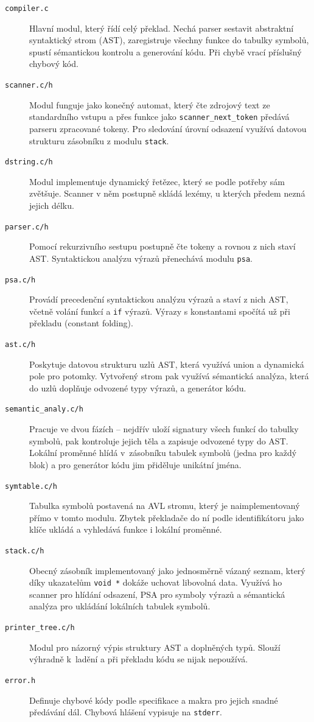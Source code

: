 \documentclass[a4paper,11pt]{article}
\begin{document}
\begin{description}
  \item[\texttt{compiler.c}] Hlavní modul, který řídí celý překlad.
  Nechá parser
  sestavit abstraktní
  syntaktický strom (AST), zaregistruje všechny funkce do tabulky symbolů, spustí
  sémantickou kontrolu a generování kódu. Při chybě vrací příslušný
  chybový kód.
  \item[\texttt{scanner.c/h}] Modul funguje jako konečný automat, který čte zdrojový text ze standardního vstupu a přes funkce jako \texttt{scanner\_next\_token} předává parseru zpracované tokeny. Pro sledování úrovní odsazení využívá datovou strukturu zásobníku z modulu \texttt{stack}.
  \item[\texttt{dstring.c/h}] Modul implementuje dynamický řetězec, který se podle potřeby sám zvětšuje. Scanner v něm postupně skládá lexémy, u kterých předem nezná jejich délku.
\item[\texttt{parser.c/h}] Pomocí rekurzivního sestupu postupně čte tokeny a rovnou z nich staví AST. Syntaktickou analýzu výrazů přenechává modulu \texttt{psa}.
\item[\texttt{psa.c/h}] Provádí precedenční syntaktickou analýzu výrazů
  a staví z nich AST, včetně volání funkcí a \texttt{if} výrazů. Výrazy
  s konstantami spočítá už při překladu (constant folding).
\item[\texttt{ast.c/h}] Poskytuje datovou strukturu uzlů AST, která využívá union a dynamická pole pro
  potomky. Vytvořený strom pak využívá sémantická analýza, která do uzlů
  doplňuje odvozené typy výrazů, a generátor kódu.
  \item[\texttt{semantic\_analy.c/h}] Pracuje ve dvou fázích -- nejdřív uloží
  signatury všech funkcí do tabulky symbolů, pak kontroluje jejich těla
  a zapisuje odvozené typy do AST. Lokální proměnné hlídá v~zásobníku tabulek
  symbolů (jedna pro každý blok) a pro generátor kódu jim přiděluje unikátní
  jména.
  \item[\texttt{symtable.c/h}] Tabulka symbolů postavená na AVL stromu, který je naimplementovaný přímo v tomto modulu. Zbytek překladače do ní podle identifikátoru jako klíče ukládá a vyhledává funkce i lokální proměnné.
\item[\texttt{stack.c/h}] Obecný zásobník implementovaný jako jednosměrně vázaný seznam, který díky ukazatelům \texttt{void *} dokáže uchovat libovolná data. Využívá ho scanner pro hlídání odsazení, PSA pro symboly výrazů a sémantická analýza pro ukládání lokálních tabulek symbolů.
  \item[\texttt{printer\_tree.c/h}] Modul pro názorný výpis struktury AST a doplněných typů. Slouží výhradně k~ladění a při překladu kódu se nijak nepoužívá.
\item[\texttt{error.h}] Definuje chybové kódy podle specifikace a makra pro
  jejich snadné předávání dál. Chybová hlášení vypisuje na \texttt{stderr}.
\end{description}
\end{document}
